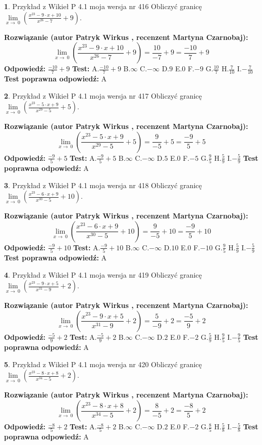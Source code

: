 \documentclass[12pt, a4paper]{article}
\theoremstyle{definition} %
\newtheorem{zad}{}
\newcommand{\zadStart}[1]{\begin{zad}#1\newline}
\newcommand{\zadStop}{\end{zad}}
\newcommand{\rozwStart}[2]{\noindent \textbf{Rozwiązanie (autor #1 , recenzent #2): }\newline}
\newcommand{\rozwStop}{\newline}
\newcommand{\odpStart}{\noindent \textbf{Odpowiedź:}\newline}
\newcommand{\odpStop}{\newline}
\newcommand{\testStart}{\noindent \textbf{Test:}\newline}
\newcommand{\testStop}{\newline}
\newcommand{\kluczStart}{\noindent \textbf{Test poprawna odpowiedź:}\newline}
\newcommand{\kluczStop}{\newline}
\begin{document}
\zadStart{Przykład z Wikieł P 4.1 moja wersja nr 416}
Obliczyć granicę $\lim\limits_{x\to\ 0}(\frac{x^{23}-9 \cdot x +10}{x^{26}-7}+9)$.
\zadStop
\rozwStart{Patryk Wirkus}{Martyna Czarnobaj}
$$\lim\limits_{x\to\ 0}(\frac{x^{23}-9 \cdot x +10}{x^{26}-7}+9)=\frac{10}{-7}+9=\frac{-10}{7}+9$$
\rozwStop
\odpStart
$\frac{-10}{7}+9$
\odpStop
\testStart
A.$\frac{-10}{7}+9$
B.$\infty$
C.$-\infty$
D.$9$
E.$0$
F.$-9$
G.$\frac{10}{7}$
H.$\frac{7}{10}$
I.$-\frac{7}{10}$
\testStop
\kluczStart
A
\kluczStop



\zadStart{Przykład z Wikieł P 4.1 moja wersja nr 417}
Obliczyć granicę $\lim\limits_{x\to\ 0}(\frac{x^{23}-5 \cdot x +9}{x^{29}-5}+5)$.
\zadStop
\rozwStart{Patryk Wirkus}{Martyna Czarnobaj}
$$\lim\limits_{x\to\ 0}(\frac{x^{23}-5 \cdot x +9}{x^{29}-5}+5)=\frac{9}{-5}+5=\frac{-9}{5}+5$$
\rozwStop
\odpStart
$\frac{-9}{5}+5$
\odpStop
\testStart
A.$\frac{-9}{5}+5$
B.$\infty$
C.$-\infty$
D.$5$
E.$0$
F.$-5$
G.$\frac{9}{5}$
H.$\frac{5}{9}$
I.$-\frac{5}{9}$
\testStop
\kluczStart
A
\kluczStop



\zadStart{Przykład z Wikieł P 4.1 moja wersja nr 418}
Obliczyć granicę $\lim\limits_{x\to\ 0}(\frac{x^{23}-6 \cdot x +9}{x^{30}-5}+10)$.
\zadStop
\rozwStart{Patryk Wirkus}{Martyna Czarnobaj}
$$\lim\limits_{x\to\ 0}(\frac{x^{23}-6 \cdot x +9}{x^{30}-5}+10)=\frac{9}{-5}+10=\frac{-9}{5}+10$$
\rozwStop
\odpStart
$\frac{-9}{5}+10$
\odpStop
\testStart
A.$\frac{-9}{5}+10$
B.$\infty$
C.$-\infty$
D.$10$
E.$0$
F.$-10$
G.$\frac{9}{5}$
H.$\frac{5}{9}$
I.$-\frac{5}{9}$
\testStop
\kluczStart
A
\kluczStop



\zadStart{Przykład z Wikieł P 4.1 moja wersja nr 419}
Obliczyć granicę $\lim\limits_{x\to\ 0}(\frac{x^{23}-9 \cdot x +5}{x^{31}-9}+2)$.
\zadStop
\rozwStart{Patryk Wirkus}{Martyna Czarnobaj}
$$\lim\limits_{x\to\ 0}(\frac{x^{23}-9 \cdot x +5}{x^{31}-9}+2)=\frac{5}{-9}+2=\frac{-5}{9}+2$$
\rozwStop
\odpStart
$\frac{-5}{9}+2$
\odpStop
\testStart
A.$\frac{-5}{9}+2$
B.$\infty$
C.$-\infty$
D.$2$
E.$0$
F.$-2$
G.$\frac{5}{9}$
H.$\frac{9}{5}$
I.$-\frac{9}{5}$
\testStop
\kluczStart
A
\kluczStop



\zadStart{Przykład z Wikieł P 4.1 moja wersja nr 420}
Obliczyć granicę $\lim\limits_{x\to\ 0}(\frac{x^{23}-8 \cdot x +8}{x^{34}-5}+2)$.
\zadStop
\rozwStart{Patryk Wirkus}{Martyna Czarnobaj}
$$\lim\limits_{x\to\ 0}(\frac{x^{23}-8 \cdot x +8}{x^{34}-5}+2)=\frac{8}{-5}+2=\frac{-8}{5}+2$$
\rozwStop
\odpStart
$\frac{-8}{5}+2$
\odpStop
\testStart
A.$\frac{-8}{5}+2$
B.$\infty$
C.$-\infty$
D.$2$
E.$0$
F.$-2$
G.$\frac{8}{5}$
H.$\frac{5}{8}$
I.$-\frac{5}{8}$
\testStop
\kluczStart
A
\kluczStop
\end{document}
